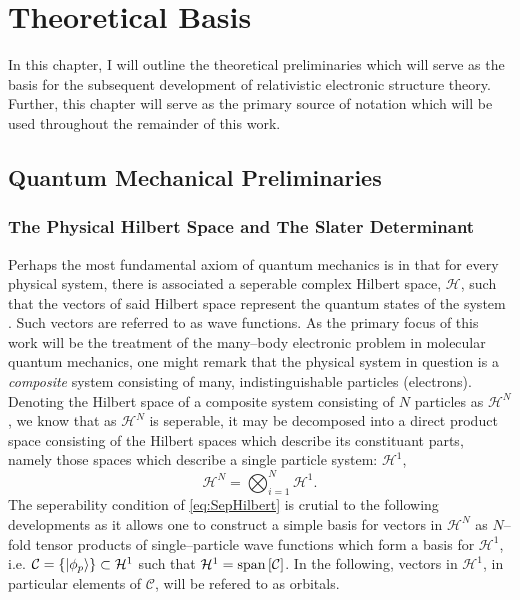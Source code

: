 \chapter{Theoretical Basis}
\label{ch:Theory}

In this chapter, I will outline the theoretical preliminaries which will serve as the basis
for the subsequent development of relativistic electronic structure theory. Further, this
chapter will serve as the primary source of notation which will be used throughout the
remainder of this work. 

\section{Quantum Mechanical Preliminaries}
\label{sec:QM}

\subsection{The Physical Hilbert Space and The Slater Determinant}
\label{sec:SD}

Perhaps the most fundamental axiom of quantum mechanics is in that for every physical
system, there is associated a seperable complex Hilbert space, $\mathcal{H}$, such that
the vectors of said Hilbert space represent the quantum states 
of the system \cite{VonNeumann55_book}. Such vectors are referred to as wave functions.
As the primary focus of this work will be the treatment of the many--body electronic
problem in molecular quantum mechanics, one might remark that the physical system
in question is a \emph{composite} system consisting of many, indistinguishable 
particles (electrons). Denoting the Hilbert space of a composite system consisting
of $N$ particles as $\mathcal{H}^N$, we know that as $\mathcal{H}^N$ is seperable,
it may be decomposed into a direct product space consisting of the Hilbert spaces
which describe its constituant parts, namely those spaces which describe a
single particle system: $\mathcal{H}^1$,
\begin{equation}
  \label{eq:SepHilbert}
  \mathcal{H}^N = \bigotimes_{i = 1}^N \mathcal{H}^1.
\end{equation}
The seperability condition of \cref{eq:SepHilbert} is crutial to the following developments
as it allows one to construct a simple basis for vectors in $\mathcal{H}^N$
as $N$--fold tensor products of single--particle wave functions which form a basis for $\mathcal{H}^1$, 
i.e. $\mathcal{C} = \left \lbrace \left\vert \phi_p \right\rangle \right\rbrace  \subset \mathcal{H}^1$ such that 
$\mathcal{H}^1 = \mathrm{span}\left[ \mathcal{C} \right]$. In the following, vectors in $\mathcal{H}^1$, in particular elements of $\mathcal{C}$,
will be refered to as orbitals.

